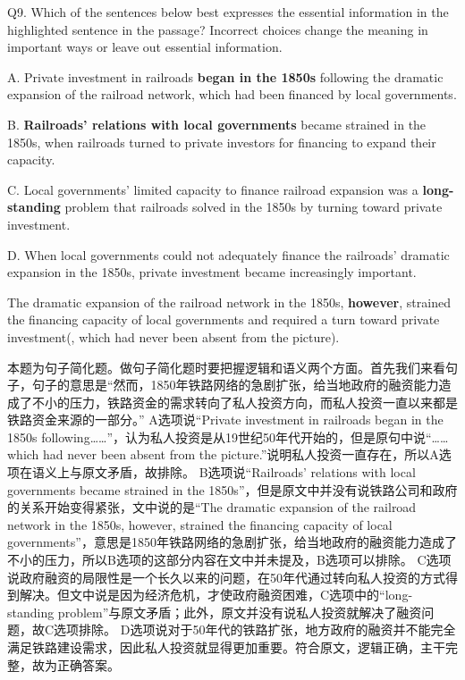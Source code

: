 \begin{blk}
    \begin{qst}
        Q9. Which of the sentences below best expresses the essential information in the highlighted sentence in the passage? Incorrect choices change the meaning in important ways or leave out essential information.
    \end{qst}

    \begin{chc}
        A. Private investment in railroads \textbf{began in the 1850s} following the dramatic expansion of the railroad network, which had been financed by local governments.

        B. \textbf{Railroads’ relations with local governments} became strained in the 1850s, when railroads turned to private investors for financing to expand their capacity.

        C. Local governments’ limited capacity to finance railroad expansion was a \textbf{long-standing} problem that railroads solved in the 1850s by turning toward private investment.

        D. When local governments could not adequately finance the railroads’ dramatic expansion in the 1850s, private investment became increasingly important.
    \end{chc}

    \begin{psgq}
        The dramatic expansion of the railroad network in the 1850s, \textbf{however}, strained the financing capacity of local governments and required a turn toward private investment(, which had never been absent from the picture).
    \end{psgq}

    \begin{nlz}
        本题为句子简化题。做句子简化题时要把握逻辑和语义两个方面。首先我们来看句子，句子的意思是“然而，1850年铁路网络的急剧扩张，给当地政府的融资能力造成了不小的压力，铁路资金的需求转向了私人投资方向，而私人投资一直以来都是铁路资金来源的一部分。” A选项说“Private investment in railroads began in the 1850s following……”，认为私人投资是从19世纪50年代开始的，但是原句中说“……which had never been absent from the picture.”说明私人投资一直存在，所以A选项在语义上与原文矛盾，故排除。 B选项说“Railroads' relations with local governments became strained in the 1850s”，但是原文中并没有说铁路公司和政府的关系开始变得紧张，文中说的是“The dramatic expansion of the railroad network in the 1850s, however, strained the financing capacity of local governments”，意思是1850年铁路网络的急剧扩张，给当地政府的融资能力造成了不小的压力，所以B选项的这部分内容在文中并未提及，B选项可以排除。 C选项说政府融资的局限性是一个长久以来的问题，在50年代通过转向私人投资的方式得到解决。但文中说是因为经济危机，才使政府融资困难，C选项中的“long-standing problem”与原文矛盾；此外，原文并没有说私人投资就解决了融资问题，故C选项排除。 D选项说对于50年代的铁路扩张，地方政府的融资并不能完全满足铁路建设需求，因此私人投资就显得更加重要。符合原文，逻辑正确，主干完整，故为正确答案。
    \end{nlz}
\end{blk}

